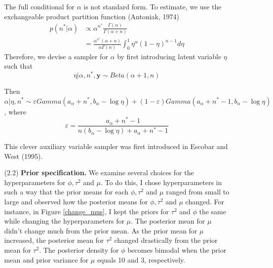 \documentclass[a4paper, 10pt]{article}
\newcommand{\nstar}{n^*}
\newcommand{\ybold}{\pmb{y}}
\newcommand{\tausq}{\tau^2}
\newcommand{\aalpha}{a_\alpha}
\newcommand{\balpha}{b_\alpha}
\newcommand{\parenth}[1]{\left(#1\right)}
\begin{document}
\begin{enumerate}
\begin{enumerate}
        The full conditional for $\alpha$ is not standard form. To estimate, we use the exchangeable product partition function (Antoniak, 1974)
        \begin{align*}
            p(\nstar|\alpha) &\propto \alpha^{\nstar} \frac{\Gamma(\alpha)}{\Gamma(\alpha + n )} \\
                &= \frac{\alpha^{\nstar} (\alpha + n)}{\alpha \Gamma(n)} \int_0^1 \eta^\alpha (1-\eta)^{n-1} d\eta
        \end{align*}
        Therefore, we devise a sampler for $\alpha$ by first introducing latent variable $\eta$ such that 
        $$\eta|\alpha,\nstar, \ybold \sim Beta(\alpha + 1, n) $$
        
        Then $\alpha| \eta, \nstar \sim \varepsilon Gamma \parenth{\aalpha + \nstar, \balpha - \log\eta } + (1-\varepsilon) Gamma \parenth{\aalpha + \nstar -1, \balpha - \log \eta }$, where 
        $$\varepsilon = \frac{\aalpha+ \nstar - 1 }{n(\balpha - \log \eta ) + \aalpha + \nstar -1 } $$
    

        This clever auxiliary variable sampler was first introduced in Escobar and West (1995).    
    
        \item[(2.2)] \textbf{Prior specification.} We examine several choices for the hyperparameters for $\phi, \tausq$ and $\mu$. To do this, I chose hyperparameters in such a way that the prior means for each $\phi, \tausq$ and $\mu$ ranged from small to large and observed how the posterior means for $\phi, \tausq$ and $\mu$ changed. 
        \clearpage
        For instance, in Figure \ref{change_mus}, I kept the priors for $\tausq$ and $\phi$ the same while changing the hyperparameters for $\mu$. The posterior mean for $\mu$ didn't change much from the prior mean. As the prior mean for $\mu$ increased, the posterior mean for $\tausq$ changed drastically from the prior mean for $\tausq$. The posterior density for $\phi$ becomes bimodal when the prior mean and prior variance for $\mu$ equals 10 and 3, respectively.
        

\end{enumerate}
\end{enumerate}
\end{document}
